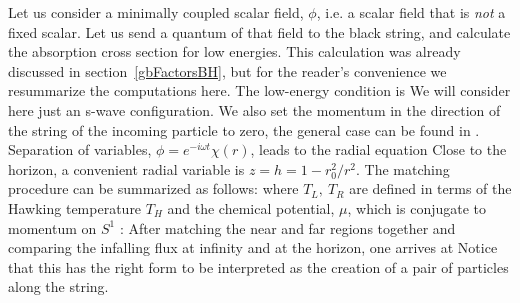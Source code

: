 Let us consider a minimally coupled scalar field, $\phi$,  i.e. a 
scalar field that is {\it not} a fixed scalar. 
Let us send a quantum of that field to the black string, and
calculate the absorption cross section for low energies. 
This calculation was already discussed in section~\ref{gbFactorsBH}, but
        for the reader's convenience we resummarize the computations
        here.  The low-energy condition is
We will consider here just an s-wave configuration. 
We also set the momentum in the direction
of the string of the incoming
particle to zero, the general case can be found in 
\cite{Maldacena:1997ix,Gubser:1996xe}.
 Separation of variables,
$\phi = e^{-i \omega t} \chi(r)$, leads to the
radial equation
 Close to the horizon, a convenient radial variable is $z = h = 1 -
r_0^2/r^2$.  The matching procedure can be summarized as follows:
where $T_L,~T_R$ are defined in terms of the Hawking temperature
$T_H$ and the chemical potential, $\mu$, which is conjugate to momentum
on $S^1$ :
 After matching the near and far regions together and comparing the
infalling flux at infinity and at the horizon, one arrives at
Notice that this has the right form to be interpreted as the 
creation of a pair of particles along the string. 

